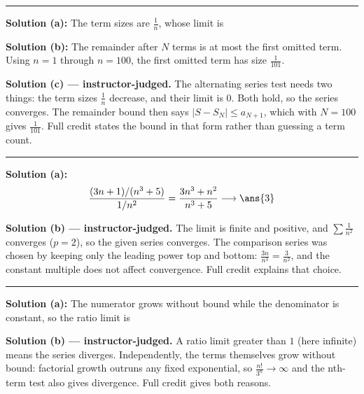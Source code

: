 \documentclass[12pt]{article}
\begin{document}
\vspace{0.2cm}\noindent\rule{\linewidth}{0.2pt}\vspace{0.2cm}


\textbf{Solution (a):} The term sizes are $\frac{1}{n}$, whose limit is 

\textbf{Solution (b):} The remainder after $N$ terms is at most the first omitted term. Using $n = 1$ through $n = 100$, the first omitted term has size $\frac{1}{101}$. 

\textbf{Solution (c) --- instructor-judged.} The alternating series test needs two things: the term sizes $\frac1n$ decrease, and their limit is $0$. Both hold, so the series converges. The remainder bound then says $|S - S_N| \le a_{N+1}$, which with $N = 100$ gives $\frac{1}{101}$. Full credit states the bound in that form rather than guessing a term count.

\vspace{0.2cm}\noindent\rule{\linewidth}{0.2pt}\vspace{0.2cm}


\textbf{Solution (a):} \[ \frac{(3n+1)/(n^{3}+5)}{1/n^{2}} = \frac{3n^{3}+n^{2}}{n^{3}+5} \longrightarrow \ans{3} \]

\textbf{Solution (b) --- instructor-judged.} The limit is finite and positive, and $\sum \frac{1}{n^2}$ converges ($p = 2$), so the given series converges. The comparison series was chosen by keeping only the leading power top and bottom: $\frac{3n}{n^3} = \frac{3}{n^2}$, and the constant multiple does not affect convergence. Full credit explains that choice.

\vspace{0.2cm}\noindent\rule{\linewidth}{0.2pt}\vspace{0.2cm}


\textbf{Solution (a):} The numerator grows without bound while the denominator is constant, so the ratio limit is \ans{\infty}

\textbf{Solution (b) --- instructor-judged.} A ratio limit greater than $1$ (here infinite) means the series diverges. Independently, the terms themselves grow without bound: factorial growth outruns any fixed exponential, so $\frac{n!}{3^n} \to \infty$ and the nth-term test also gives divergence. Full credit gives both reasons.
\end{document}
